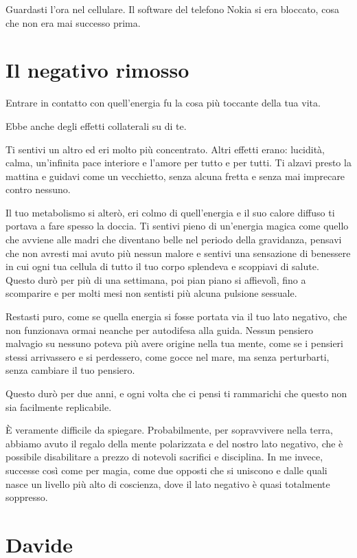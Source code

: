 Guardasti l'ora nel cellulare. Il software del telefono Nokia si era bloccato, cosa che non era mai successo prima.

\section{Il negativo rimosso}
\label{il_negativo_rimosso}

Entrare in contatto con quell'energia fu la cosa più toccante della tua vita.

Ebbe anche degli effetti collaterali su di te.

Ti sentivi un altro ed eri molto più concentrato. Altri effetti erano: lucidità, calma, un'infinita pace interiore e l'amore per tutto e per tutti. Ti alzavi presto la mattina e guidavi come un vecchietto, senza alcuna fretta e senza mai imprecare contro nessuno.

Il tuo metabolismo si alterò, eri colmo di quell'energia e il suo calore diffuso ti portava a fare spesso la doccia. Ti sentivi pieno di un'energia magica come quello che avviene alle madri che diventano belle nel periodo della gravidanza, pensavi che non avresti mai avuto più nessun malore e sentivi una sensazione di benessere in cui ogni tua cellula di tutto il tuo corpo splendeva e scoppiavi di salute. Questo durò per più di una settimana, poi pian piano si affievolì, fino a scomparire e per molti mesi non sentisti più alcuna pulsione sessuale.

Restasti puro, come se quella energia si fosse portata via il tuo lato negativo, che non funzionava ormai neanche per autodifesa alla guida. Nessun pensiero malvagio su nessuno poteva più avere origine nella tua mente, come se i pensieri stessi arrivassero e si perdessero, come gocce nel mare, ma senza perturbarti, senza cambiare il tuo pensiero.

Questo durò per due anni, e ogni volta che ci pensi ti rammarichi che questo non sia facilmente replicabile.

È veramente difficile da spiegare. Probabilmente, per sopravvivere nella terra, abbiamo avuto il regalo della mente polarizzata e del nostro lato negativo, che è possibile disabilitare a prezzo di notevoli sacrifici e disciplina. In me invece, successe così come per magia, come due opposti che si uniscono e dalle quali nasce un livello più alto di coscienza, dove il lato negativo è quasi totalmente soppresso.

\section{Davide}
\label{maurizio}

